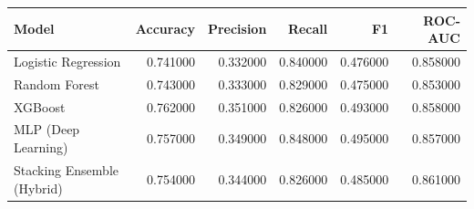 \begin{tabular}{lrrrrr}
\toprule
Model & Accuracy & Precision & Recall & F1 & ROC-AUC \\
\midrule
Logistic Regression & 0.741000 & 0.332000 & 0.840000 & 0.476000 & 0.858000 \\
Random Forest & 0.743000 & 0.333000 & 0.829000 & 0.475000 & 0.853000 \\
XGBoost & 0.762000 & 0.351000 & 0.826000 & 0.493000 & 0.858000 \\
MLP (Deep Learning) & 0.757000 & 0.349000 & 0.848000 & 0.495000 & 0.857000 \\
Stacking Ensemble (Hybrid) & 0.754000 & 0.344000 & 0.826000 & 0.485000 & 0.861000 \\
\bottomrule
\end{tabular}
